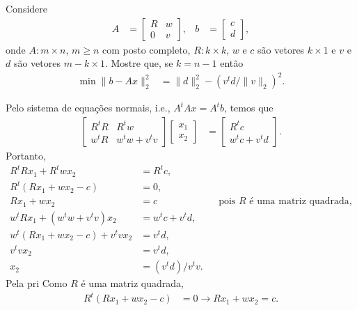 \documentclass[a4paper,12pt, leqno, answers]{exam}
\begin{document}
\begin{questions}
    \question Considere
    \begin{align*}
        A &= \begin{bmatrix}
            R & w \\
            0 & v
        \end{bmatrix}, & b &= \begin{bmatrix}
            c \\
            d
        \end{bmatrix},
    \end{align*}
    onde $A : m \times n$, $m \geq n$ com posto completo, $R : k \times k$, $w$ e $c$ s\~{a}o vetores $k \times 1$ e $v$ e $d$ s\~{a}o vetores $m - k \times 1$. Mostre que, se $k = n - 1$ ent\~{a}o 
    \begin{align*}
        \min \| b - A x \|_2^2 &= \| d \|_2^2 - \left( v^t d / \| v \|_2 \right)^2.
    \end{align*}
    \begin{solution}
        Pelo sistema de equa\c{c}\~{o}es normais, i.e., $A^t A x = A^t b$, temos que
        \begin{align*}
            \begin{bmatrix}
                R^t R & R^t w \\
                w^t R & w^t w + v^t v
            \end{bmatrix} \begin{bmatrix}
                x_1 \\
                x_2
            \end{bmatrix} &= \begin{bmatrix}
                R^t c \\
                w^t c + v^t d
            \end{bmatrix}.
        \end{align*}
        Portanto,
        \begin{align*}
            R^t R x_1 + R^t w x_2 &= R^t c, \\
            R^t \left( R x_1 + w x_2 - c \right) &= 0, \\
            R x_1 + w x_2 &= c && \text{pois $R$ \'{e} uma matriz quadrada,} \\
            w^t R x_1 + \left( w^t w + v^t v \right) x_2 &= w^t c + v^t d, \\
            w^t \left( R x_1 + w x_2 - c \right) + v^t v x_2 &= v^t d, \\
            v^t v x_2 &= v^t d, \\
            x_2 &= \left( v^t d \right) / v^t v.
        \end{align*}
        Pela pri
        Como $R$ \'{e} uma matriz quadrada,
        \begin{align*}
            R^t \left( R x_1 + w x_2 - c \right) &= 0 \rightarrow R x_1 + w x_2 = c.
        \end{align*}


\end{solution}
\end{questions}
\end{document}
